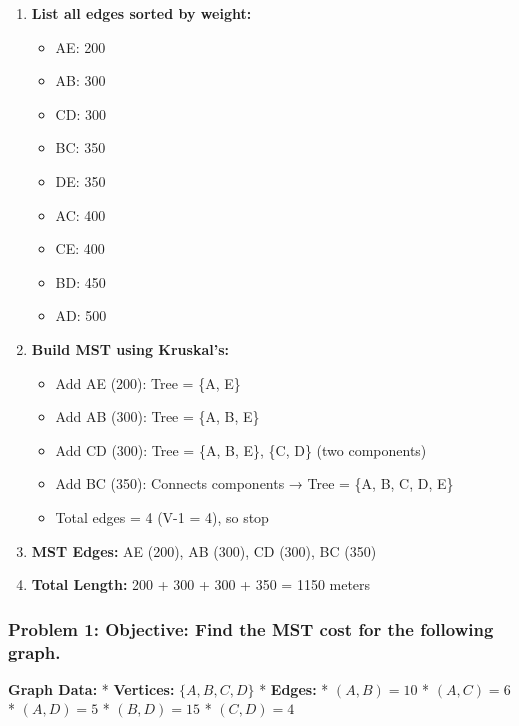 \documentclass[
  letterpaper,
  DIV=11,
  numbers=noendperiod]{scrreprt}
\providecommand{\tightlist}{%
  \setlength{\itemsep}{0pt}\setlength{\parskip}{0pt}}
\begin{document}
\begin{enumerate}
\def\labelenumi{\arabic{enumi}.}
\item
  \textbf{List all edges sorted by weight:}

  \begin{itemize}
  \tightlist
  \item
    AE: 200
  \item
    AB: 300\\
  \item
    CD: 300
  \item
    BC: 350
  \item
    DE: 350
  \item
    AC: 400
  \item
    CE: 400
  \item
    BD: 450
  \item
    AD: 500
  \end{itemize}
\item
  \textbf{Build MST using Kruskal's:}

  \begin{itemize}
  \tightlist
  \item
    Add AE (200): Tree = \{A, E\}
  \item
    Add AB (300): Tree = \{A, B, E\}
  \item
    Add CD (300): Tree = \{A, B, E\}, \{C, D\} (two components)
  \item
    Add BC (350): Connects components → Tree = \{A, B, C, D, E\}
  \item
    Total edges = 4 (V-1 = 4), so stop
  \end{itemize}
\item
  \textbf{MST Edges:} AE (200), AB (300), CD (300), BC (350)
\item
  \textbf{Total Length:} 200 + 300 + 300 + 350 = 1150 meters
\end{enumerate}

\subsubsection{\texorpdfstring{Problem 1: \textbf{Objective:} Find the
MST cost for the following
graph.}{Problem 1: Objective: Find the MST cost for the following graph.}}\label{problem-1-objective-find-the-mst-cost-for-the-following-graph.}

\textbf{Graph Data:} * \textbf{Vertices:} \(\{A, B, C, D\}\) *
\textbf{Edges:} * \((A, B) = 10\) * \((A, C) = 6\) * \((A, D) = 5\) *
\((B, D) = 15\) * \((C, D) = 4\)
\end{document}
